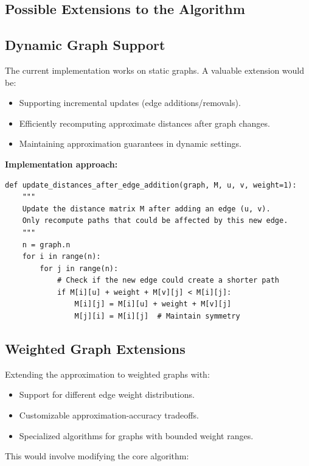 \documentclass[a4paper,11pt,oneside]{book}
\begin{document}
\subsection{Possible Extensions to the Algorithm}
\subsection*{Dynamic Graph Support}
The current implementation works on static graphs. A valuable extension would be:
\begin{itemize}
    \item Supporting incremental updates (edge additions/removals).
    \item Efficiently recomputing approximate distances after graph changes.
    \item Maintaining approximation guarantees in dynamic settings.
\end{itemize}

\textbf{Implementation approach:}
\begin{verbatim}
def update_distances_after_edge_addition(graph, M, u, v, weight=1):
    """
    Update the distance matrix M after adding an edge (u, v).
    Only recompute paths that could be affected by this new edge.
    """
    n = graph.n
    for i in range(n):
        for j in range(n):
            # Check if the new edge could create a shorter path
            if M[i][u] + weight + M[v][j] < M[i][j]:
                M[i][j] = M[i][u] + weight + M[v][j]
                M[j][i] = M[i][j]  # Maintain symmetry
\end{verbatim}

\subsection*{Weighted Graph Extensions}
Extending the approximation to weighted graphs with:
\begin{itemize}
    \item Support for different edge weight distributions.
    \item Customizable approximation-accuracy tradeoffs.
    \item Specialized algorithms for graphs with bounded weight ranges.
\end{itemize}

This would involve modifying the core algorithm:
\end{document}
